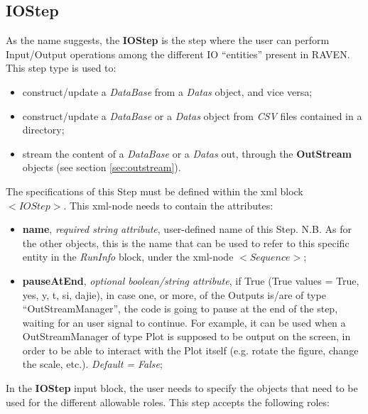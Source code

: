 \subsection{IOStep}
\label{subsec:stepIOStep}
As the name suggests, the  \textbf{IOStep} is the step where the user can perform Input/Output operations among the different IO ``entities'' present in RAVEN. This step type is used to: 
\begin{itemize}
 \item construct/update a \textit{DataBase} from a \textit{Datas} object, and vice versa;
 \item construct/update a \textit{DataBase} or a \textit{Datas} object from \textit{CSV} files contained in a directory;
 \item stream the content of a \textit{DataBase} or a \textit{Datas} out, through the \textbf{OutStream} objects (see section \ref{sec:outstream}).
\end{itemize}
 The specifications of this Step must be defined within the xml block $<IOStep>$. This xml-node needs to contain the attributes:
\vspace{-5mm}
\begin{itemize}
\itemsep0em
\item \textbf{name}, \textit{required string attribute}, user-defined name of this Step. N.B. As for the other objects, this is the name that can be used to refer to this specific entity in the \textit{RunInfo} block, under the xml-node $<Sequence>$;
\item \textbf{pauseAtEnd}, \textit{optional boolean/string attribute}, if True (True values = True, yes, y, t, si, dajie), in case one, or more, of the Outputs is/are of type ``OutStreamManager'', the code is going to pause at the end of the step, waiting for an user signal to continue. For example, it can be used when a OutStreamManager of type Plot is supposed to be output on the screen, in order to be able to interact with the Plot itself (e.g. rotate the figure, change the scale, etc.).  \textit{Default = False};
\end{itemize}
\vspace{-5mm}
In the \textbf{IOStep} input block, the user needs to specify the objects that need to be used for the different allowable roles. This step accepts the following roles:
